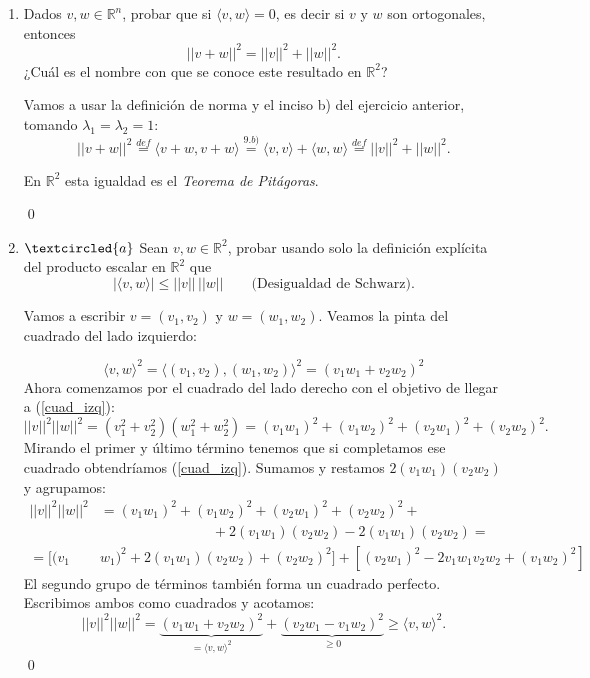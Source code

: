 \begin{enumerate}[topsep=6pt, itemsep=.4cm]
\qed

\item Dados $v, w\in \mathbb R^n$, probar que si  $\langle v , w  \rangle =0$, es decir si $v$ y $w$ son ortogonales,  entonces
	\begin{equation*}
	||v + w||^2 = ||v||^2 + ||w||^2.
	\end{equation*}
	¿Cuál es el nombre con que se conoce este resultado en $\mathbb R^2$?
	
\rta Vamos a usar la definición de norma y el inciso b) del ejercicio anterior, tomando $\lambda_1 = \lambda_2 = 1$:
$$||v + w||^2 \overset{def}{=} \langle v+w,v+w \rangle \overset{9.b)}{=} \langle v,v \rangle + \langle w,w \rangle \overset{def}{=} ||v||^2 + ||w||^2.$$


En $\mathbb R^2$ esta igualdad es el \emph{Teorema de Pitágoras}.

\qed
 
\item\label{Schwarz} $\textcircled{a}$ Sean $v,w\in \mathbb R^2$, probar usando  solo la definición explícita del producto escalar en $\mathbb R^2$ que 
\begin{equation*}
	|\langle v , w  \rangle| \le ||v||\,||w|| \qquad \text{(Desigualdad de Schwarz).}
\end{equation*}

\rta Vamos a escribir $v = (v_1 , v_2)$ y $w=(w_1,w_2) $. Veamos la pinta del cuadrado del lado izquierdo:

\begin{equation}\label{cuad_izq}
\langle v,w \rangle^2 = \langle (v_1,v_2) , (w_1,w_2) \rangle^2 =  (v_1 w_1 + v_2 w_2 )^2
\end{equation}
Ahora comenzamos por el cuadrado del lado derecho con el objetivo de llegar a (\ref{cuad_izq}):
\begin{equation*}
||v||^2||w||^2 = (v_1^2 + v_2^2)(w_1^2 + w_2^2) = (v_1 w_1)^2 + (v_1 w_2)^2 + (v_2 w_1)^2 + (v_2 w_2)^2.
\end{equation*}
Mirando el primer y último término tenemos que si completamos ese cuadrado obtendríamos (\ref{cuad_izq}). Sumamos y restamos $2(v_1w_1)(v_2w_2)$ y agrupamos:
\begin{align*}
    ||v||^2||w||^2 &= (v_1 w_1)^2 + (v_1 w_2)^2 + (v_2 w_1)^2 + (v_2 w_2)^2+ \\
                & \qquad\qquad\qquad\qquad+ 2(v_1w_1)(v_2w_2) - 2(v_1w_1)(v_2w_2) = \\
                = [(v_1 &w_1)^2 + 2(v_1w_1)(v_2w_2) + (v_2 w_2)^2 ] + [(v_2 w_1)^2 - 2v_1w_1v_2w_2 + (v_1 w_2)^2 ]
\end{align*}
El segundo grupo de términos también forma un cuadrado perfecto. Escribimos ambos como cuadrados y acotamos:
\begin{equation*}
    ||v||^2||w||^2 = \underset{= \langle v,w \rangle^2}{ \underbrace{ (v_1w_1 + v_2w_2)^2} } + \underset{\geq 0}{ \underbrace{ (v_2w_1 - v_1w_2)^2}} \geq \langle v,w \rangle^2.
\end{equation*}
  \qed

\end{enumerate}

